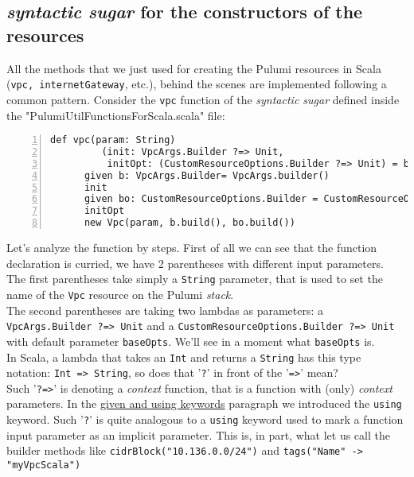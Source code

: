 \subsection{\textit{syntactic sugar} for the constructors of the resources}
All the methods that we just used for creating the Pulumi resources in Scala (\texttt{vpc, internetGateway}, etc.), behind the scenes are implemented following a common pattern.
Consider the \texttt{vpc} function of the \textit{syntactic sugar} defined inside the "PulumiUtilFunctionsForScala.scala" file:\\
\begin{minipage}{\linewidth}
\begin{lstlisting}[numbers=left, numberstyle=\tiny, numbersep=-5pt, stepnumber=1]
  def vpc(param: String)
         (init: VpcArgs.Builder ?=> Unit,
          initOpt: (CustomResourceOptions.Builder ?=> Unit) = baseOpts): Vpc =
	  given b: VpcArgs.Builder= VpcArgs.builder()
	  init
	  given bo: CustomResourceOptions.Builder = CustomResourceOptions.builder()
	  initOpt
	  new Vpc(param, b.build(), bo.build())
\end{lstlisting}
\end{minipage}
Let's analyze the function by steps.
First of all we can see that the function declaration is curried, we have 2 parentheses with different input parameters.\\
The first parentheses take simply a \texttt{String} parameter, that is used to set the name of the \texttt{Vpc} resource on the Pulumi \textit{stack}.\\
The second parentheses are taking two lambdas as parameters: a \texttt{VpcArgs.Builder ?=> Unit}  and a \texttt{CustomResourceOptions.Builder ?=> Unit} with default parameter \texttt{baseOpts}. We'll see in a moment what \texttt{baseOpts} is.\\
In Scala, a lambda that takes an \texttt{Int} and returns a \texttt{String} has this type notation: \texttt{Int => String}, so does that '\texttt{?}' in front of the '\texttt{=>}' mean?\\
Such '\texttt{?=>}' is denoting a \textit{context} function, that is a function with (only) \textit{context} parameters.
In the \hyperref[par:given-using]{given and using keywords} paragraph we introduced the \texttt{using} keyword.
Such '\texttt{?}' is quite analogous to a \texttt{using} keyword used to mark a function input parameter as an implicit parameter.
This is, in part, what let us call the builder methods like \texttt{cidrBlock("10.136.0.0/24")} and \texttt{tags("Name" -> "myVpcScala")} 
